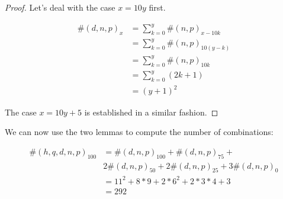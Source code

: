 \begin{proof}
 
Let's deal with the case $x = 10y$ first.

\begin{equation*}
    \begin{split}
      \#(d, n, p)_{x} & = \sum_{k = 0}^{y} \#(n, p)_{x - 10k}\\
                               & =  \sum_{k = 0}^{y} \#(n, p)_{10 (y - k)} \\
                               & =  \sum_{k = 0}^{y} \#(n, p)_{10 k} \\
                               & =  \sum_{k = 0}^{y} (2 k + 1) \\
                               & = (y + 1)^2
    \end{split}
\end{equation*}  

The case $x = 10y + 5$ is established in a similar fashion.
\end{proof}

We can now use the two lemmas to compute the number of combinations:

\begin{equation*}
    \begin{split}
     \#(h, q, d, n, p)_{100} & =\#(d, n, p)_{100} +  \#(d, n, p)_{75} +\\
            & 2 \#(d, n, p)_{50} + 2 \#(d, n, p)_{25} + 3 \#(d, n, p)_0\\
                               & =  11^2 +  8 * 9 + 2 * 6^2 + 2 * 3 * 4 + 3\\
                               & = 292
    \end{split}
\end{equation*}  
